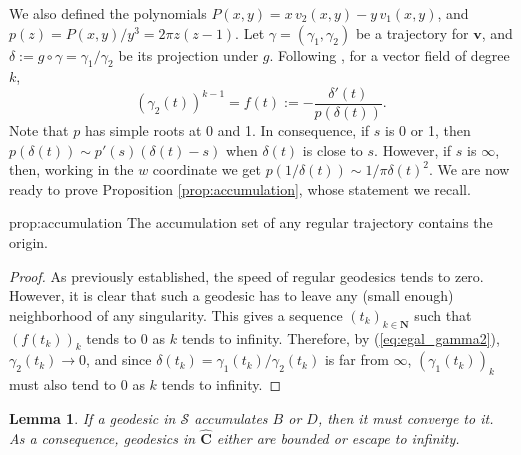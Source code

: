 \documentclass[11pt]{article}
\newtheorem{lemma}[thm]{Lemma}
\begin{document}
We also defined the polynomials $P(x,y)=x\,v_{2}(x,y)-y\,v_{1}(x,y)$, and $p(z)=P(x,y)/y^{3}=2\pi z(z-1)$. Let $\gamma=(\gamma_{1},\gamma_{2})$ be a trajectory for $\mathbf{v}$, and $\delta:=g\circ\gamma=\gamma_{1}/\gamma_{2}$ be its projection under $g$.  Following \cite{BuffRaissy}, for a vector field of degree $k$,
\begin{equation}
\label{eq:egal_gamma2}
\left(\gamma_{2}(t)\right)^{k-1}=f(t):=-\frac{\delta'(t)}{p(\delta(t))}.
\end{equation}
Note that $p$ has simple roots at 0 and 1. In consequence, if $s$ is 0 or 1, then $p(\delta(t))\sim p'(s)(\delta(t)-s)$ when $\delta(t)$ is close to $s$. However, if $s$ is $\infty$, then, working in the $w$ coordinate we get $p(1/\delta(t))\sim1/\pi\delta(t)^{2}$. We are now ready to prove Proposition \ref{prop:accumulation}, whose statement we recall.

\begin{repprop}{prop:accumulation}
    The accumulation set of any regular trajectory contains the origin.
\end{repprop}

\begin{proof}
    As previously established, the speed of regular geodesics tends to zero. However, it is clear that such a geodesic has to leave any (small enough) neighborhood of any singularity. This gives a sequence $(t_{k})_{k\in\mathbf{N}}$ such that $(f(t_{k}))_{k}$ tends to 0 as $k$ tends to infinity. Therefore, by (\ref{eq:egal_gamma2}), $\gamma_{2}(t_{k})\rightarrow0$, and since $\delta(t_{k})=\gamma_{1}(t_{k})/\gamma_{2}(t_{k})$ is far from $\infty$, $(\gamma_{1}(t_{k}))_{k}$ must also tend to 0 as $k$ tends to infinity.
\end{proof}

\begin{lemma}
    If a geodesic in $\mathcal{S}$ accumulates $B$ or $D$, then it must converge to it. As a consequence, geodesics in $\widehat{\mathbf{C}}$ either are bounded or escape to infinity.
\end{lemma}
\end{document}
